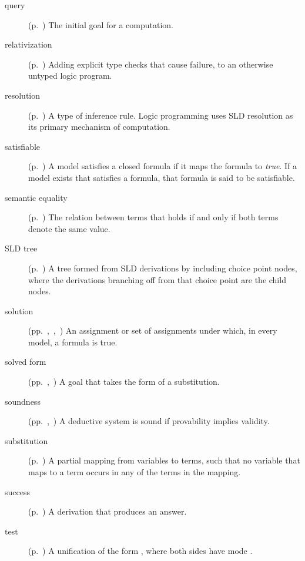 \begin{description}
\item[query]
(p.~\pageref{sec:queries})
The initial goal for a computation.

\item[relativization]
(p.~\pageref{gi:relativization})
Adding explicit type checks that cause failure,
to an otherwise untyped logic program.

\item[resolution]
(p.~\pageref{gi:resolution})
A type of inference rule.
Logic programming uses SLD resolution
as its primary mechanism of computation.

\item[satisfiable]
(p.~\pageref{gi:satisfiable})
A model satisfies a closed formula if it maps the formula to \textit{true}.
If a model exists that satisfies a formula,
that formula is said to be satisfiable.

\item[semantic equality]
(p.~\pageref{gi:semantic-equality})
The relation between terms that holds
if and only if both terms denote the same value.

\item[SLD tree]
(p.~\pageref{gi:sld-tree})
A tree formed from SLD derivations by including choice point nodes,
where the derivations branching off from that choice point
are the child nodes.

\item[solution]
(pp.~\pageref{gi:solution},~\pageref{gi:solution2},~\pageref{gi:solution3})
An assignment or set of assignments under which, in every model,
a formula is true.

\item[solved form]
(pp.~\pageref{gi:solved-form},~\pageref{gi:solved-form2})
A goal that takes the form of a substitution.

\item[soundness]
(pp.~\pageref{thm:soundness},~\pageref{gi:soundness2})
A deductive system is sound if provability implies validity.

\item[substitution]
(p.~\pageref{gi:substitution})
A partial mapping from variables to terms,
such that no variable that maps to a term
occurs in any of the terms in the mapping.

\item[success]
(p.~\pageref{gi:success})
A derivation that produces an answer.

\item[test]
(p.~\pageref{gi:test})
A unification of the form ,
where both sides have mode .


\end{description}
